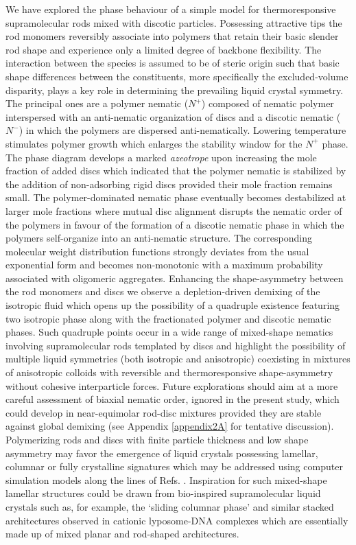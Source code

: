We have explored the phase behaviour of a simple model for thermoresponsive supramolecular rods mixed with discotic particles. Possessing attractive tips the rod monomers reversibly associate into polymers that retain their basic slender rod shape and experience only a limited degree of backbone flexibility. The interaction between the species is assumed to be  of steric origin such that basic shape differences between the constituents, more specifically the excluded-volume disparity, plays a key role in determining the prevailing liquid crystal symmetry. The principal ones are a   polymer nematic ($N^{+}$) composed of nematic polymer interspersed with an anti-nematic organization of discs and a discotic nematic  ($N^{-}$) in which the polymers are dispersed anti-nematically.   Lowering   temperature stimulates  polymer growth which  enlarges the stability window for the $N^{+}$ phase.  The phase diagram  develops a marked {\em azeotrope} upon increasing the mole fraction of added discs which indicated that the  polymer nematic is stabilized by the addition of non-adsorbing rigid discs provided their mole fraction remains small. 
The polymer-dominated nematic phase eventually becomes destabilized at larger mole fractions where mutual disc alignment disrupts  the nematic  order of the polymers in favour of the formation of a discotic nematic phase in which the polymers self-organize into an anti-nematic structure. The corresponding molecular weight distribution functions strongly deviates from the usual exponential form and becomes non-monotonic with a maximum probability associated with oligomeric aggregates. Enhancing the shape-asymmetry between the rod monomers and discs we observe a depletion-driven demixing of the isotropic fluid which opens up the possibility of a quadruple existence featuring two isotropic phase along with the fractionated polymer and discotic nematic phases. Such quadruple points occur in a wide range of mixed-shape nematics involving supramolecular rods templated by discs and highlight the possibility of multiple liquid symmetries (both isotropic and anisotropic) coexisting in  mixtures of anisotropic colloids with reversible and thermoresponsive shape-asymmetry without cohesive interparticle forces.   Future explorations should aim at a more careful assessment of biaxial nematic order, ignored in the present study,  which could develop in near-equimolar rod-disc mixtures provided they are stable against global demixing (see Appendix \ref{appendix2A} for tentative discussion). Polymerizing rods and discs with finite particle thickness and low shape asymmetry may favor the emergence of liquid crystals possessing lamellar, columnar or fully crystalline signatures  \cite{peroukidis2010} which may be addressed using  computer simulation models along the lines of Refs. \cite{kuriabova2010,nguyen2014,perouklapp2020}. Inspiration for such mixed-shape  lamellar structures  could be drawn from bio-inspired supramolecular liquid crystals \cite{safinya2013} such as, for example, the `sliding columnar phase' and similar stacked architectures  observed in cationic lyposome-DNA complexes \cite{wong2000,ohern1998} which are essentially made up of mixed planar and rod-shaped architectures.

